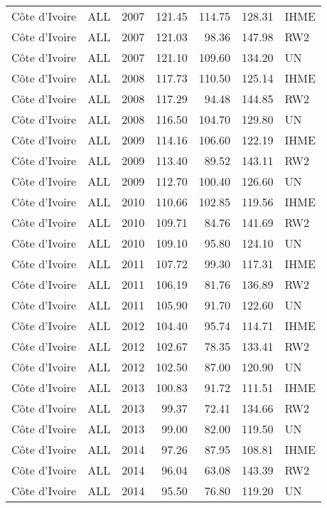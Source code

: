 \begin{longtable}{lllrrrl}
  C\^{o}te d'Ivoire & ALL & 2007 & 121.45 & 114.75 & 128.31 & IHME \\ 
  C\^{o}te d'Ivoire & ALL & 2007 & 121.03 & 98.36 & 147.98 & RW2 \\ 
  C\^{o}te d'Ivoire & ALL & 2007 & 121.10 & 109.60 & 134.20 & UN \\ 
  C\^{o}te d'Ivoire & ALL & 2008 & 117.73 & 110.50 & 125.14 & IHME \\ 
  C\^{o}te d'Ivoire & ALL & 2008 & 117.29 & 94.48 & 144.85 & RW2 \\ 
  C\^{o}te d'Ivoire & ALL & 2008 & 116.50 & 104.70 & 129.80 & UN \\ 
  C\^{o}te d'Ivoire & ALL & 2009 & 114.16 & 106.60 & 122.19 & IHME \\ 
  C\^{o}te d'Ivoire & ALL & 2009 & 113.40 & 89.52 & 143.11 & RW2 \\ 
  C\^{o}te d'Ivoire & ALL & 2009 & 112.70 & 100.40 & 126.60 & UN \\ 
  C\^{o}te d'Ivoire & ALL & 2010 & 110.66 & 102.85 & 119.56 & IHME \\ 
  C\^{o}te d'Ivoire & ALL & 2010 & 109.71 & 84.76 & 141.69 & RW2 \\ 
  C\^{o}te d'Ivoire & ALL & 2010 & 109.10 & 95.80 & 124.10 & UN \\ 
  C\^{o}te d'Ivoire & ALL & 2011 & 107.72 & 99.30 & 117.31 & IHME \\ 
  C\^{o}te d'Ivoire & ALL & 2011 & 106.19 & 81.76 & 136.89 & RW2 \\ 
  C\^{o}te d'Ivoire & ALL & 2011 & 105.90 & 91.70 & 122.60 & UN \\ 
  C\^{o}te d'Ivoire & ALL & 2012 & 104.40 & 95.74 & 114.71 & IHME \\ 
  C\^{o}te d'Ivoire & ALL & 2012 & 102.67 & 78.35 & 133.41 & RW2 \\ 
  C\^{o}te d'Ivoire & ALL & 2012 & 102.50 & 87.00 & 120.90 & UN \\ 
  C\^{o}te d'Ivoire & ALL & 2013 & 100.83 & 91.72 & 111.51 & IHME \\ 
  C\^{o}te d'Ivoire & ALL & 2013 & 99.37 & 72.41 & 134.66 & RW2 \\ 
  C\^{o}te d'Ivoire & ALL & 2013 & 99.00 & 82.00 & 119.50 & UN \\ 
  C\^{o}te d'Ivoire & ALL & 2014 & 97.26 & 87.95 & 108.81 & IHME \\ 
  C\^{o}te d'Ivoire & ALL & 2014 & 96.04 & 63.08 & 143.39 & RW2 \\ 
  C\^{o}te d'Ivoire & ALL & 2014 & 95.50 & 76.80 & 119.20 & UN \\ 

\end{longtable}
